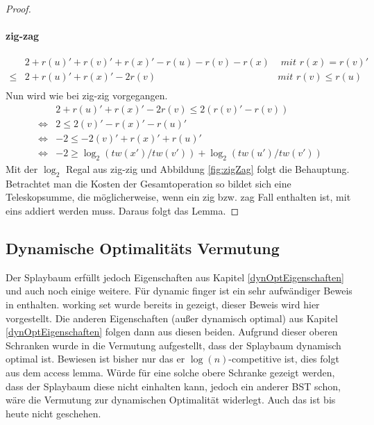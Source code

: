 \documentclass[a4paper,12pt]{article}
\begin{document}
\begin{proof}
\paragraph{zig-zag} 
\begin{align*}
&2 + r\left(u\right)' +r\left(v\right)' +r\left(x\right)' - r\left(u\right)- r\left(v\right)- r\left(x\right) &\textit{ mit $r\left(x\right) =  r\left(v\right)'$ }\\
\leq& 2 + r\left(u\right)' +r\left(x\right)' - 2 r\left(v\right) &\textit{mit $r\left(v\right) \leq  r\left(u\right)$}\\
\end{align*}
Nun wird wie bei zig-zig vorgegangen.
\begin{align*}
&  2 + r\left(u\right)' +r\left(x\right)' - 2 r\left(v\right) \leq  2\left(r\left(v\right)'- r\left(v\right)\right)\\
\Leftrightarrow &2 \leq 2\left(v\right)' -  r\left(x\right)' - r\left(u\right)'\\
\Leftrightarrow &-2 \leq -2\left(v\right)' +  r\left(x\right)' + r\left(u\right)'\\
\Leftrightarrow & -2 \geq \log_2\left(\mathit{tw}\left(x'\right) / \mathit{tw}\left(v'\right)\right) + \log_2\left(\mathit{tw}\left(u'\right) / \mathit{tw}\left(v'\right)\right)
\end{align*}
Mit der $\log_2$ Regal aus zig-zig und Abbildung \ref{fig:zigZag} folgt die Behauptung.
Betrachtet man die Kosten der Gesamtoperation so bildet sich eine Teleskopsumme, die möglicherweise, wenn ein  zig bzw. zag Fall enthalten ist, mit eins addiert werden muss. Daraus folgt das Lemma.
\end{proof}

\subsection{Dynamische Optimalitäts Vermutung}
 Der Splaybaum erfüllt  jedoch Eigenschaften aus Kapitel \ref{dynOptEigenschaften} und auch noch einige weitere. Für dynamic finger ist ein sehr aufwändiger Beweis in \cite{dynFInger} enthalten. working set wurde bereits in \cite{splay} gezeigt, dieser Beweis wird hier vorgestellt. Die anderen Eigenschaften (außer dynamisch optimal) aus Kapitel \ref{dynOptEigenschaften} folgen dann aus diesen beiden. Aufgrund dieser oberen Schranken wurde in \cite{splay} die Vermutung aufgestellt, dass der Splaybaum dynamisch optimal ist. Bewiesen ist bisher nur das er $\log \left(n\right)$-competitive ist, dies folgt aus dem access lemma. Würde für eine solche obere Schranke gezeigt werden, dass der Splaybaum diese nicht einhalten kann, jedoch ein anderer BST schon, wäre die Vermutung zur dynamischen Optimalität widerlegt. Auch das ist bis heute nicht geschehen. 
 
\end{document}
